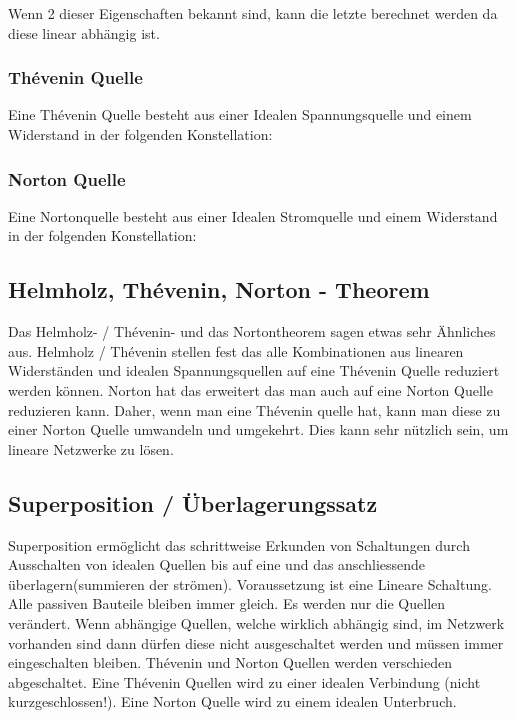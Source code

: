 Wenn 2 dieser Eigenschaften bekannt sind, kann die letzte berechnet werden da diese linear abhängig ist.

\subsubsection{Thévenin Quelle}

Eine Thévenin Quelle besteht aus einer Idealen Spannungsquelle und einem Widerstand in der folgenden Konstellation:

\begin{center}
    
\end{center}

\subsubsection{Norton Quelle}

Eine Nortonquelle besteht aus einer Idealen Stromquelle und einem Widerstand in der folgenden Konstellation:

\begin{center}
    
\end{center}

\subsection{Helmholz, Thévenin, Norton - Theorem}

Das Helmholz- / Thévenin- und das Nortontheorem sagen etwas sehr Ähnliches aus. 
Helmholz / Thévenin stellen fest das alle Kombinationen aus linearen Widerständen und idealen Spannungsquellen auf eine Thévenin Quelle reduziert werden können. 
Norton hat das erweitert das man auch auf eine Norton Quelle reduzieren kann. 
Daher, wenn man eine Thévenin quelle hat, kann man diese zu einer Norton Quelle umwandeln und umgekehrt. 
Dies kann sehr nützlich sein, um lineare Netzwerke zu lösen.

\subsection{Superposition / Überlagerungssatz}

Superposition ermöglicht das schrittweise Erkunden von Schaltungen durch Ausschalten von idealen Quellen bis auf eine und das anschliessende überlagern(summieren der strömen). 
Voraussetzung ist eine Lineare Schaltung. 
Alle passiven Bauteile bleiben immer gleich. 
Es werden nur die Quellen verändert. 
Wenn abhängige Quellen, welche wirklich abhängig sind, im Netzwerk vorhanden sind dann dürfen diese nicht ausgeschaltet werden und müssen immer eingeschalten bleiben. 
Thévenin und Norton Quellen werden verschieden abgeschaltet. 
Eine Thévenin Quellen wird zu einer idealen Verbindung (nicht kurzgeschlossen!). 
Eine Norton Quelle wird zu einem idealen Unterbruch.


